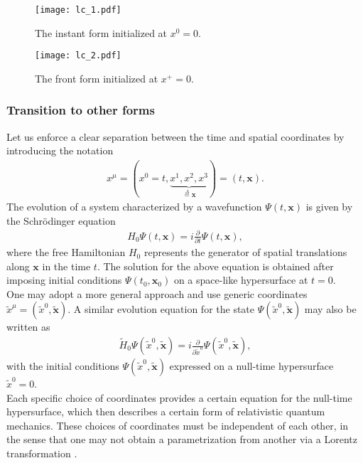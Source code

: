 \begin{figure*}[!h]
\captionsetup[subfigure]{justification=centering}
\begin{subfigure}{.49\textwidth}
  \centering
  \texttt{[image: lc\_1.pdf]}  
  \caption*{\normalsize The instant form initialized at $x^0=0$.}   
\end{subfigure}
\begin{subfigure}{.49\textwidth}
  \centering
  \texttt{[image: lc\_2.pdf]}  
  \caption*{\normalsize The front form initialized at $x^+=0$.}
\end{subfigure}
\end{figure*}

\subsubsection*{\sffamily Transition to other forms}
Let us enforce a clear separation between the time and spatial coordinates by introducing the notation
\begin{align*}
x^\mu=(x^0=t,\underbrace{x^1,x^2,x^3}_{\overset{\Delta}{=}\mathbf{x}})=(t,\mathbf{x}).
\end{align*}
The evolution of a system characterized by a wavefunction $\Psi(t,\mathbf{x})$ is given by the Schr\"{o}dinger equation
\begin{align*}
H_0\Psi(t,\mathbf{x})=i\frac{\partial}{\partial t}\Psi(t,\mathbf{x}),
\end{align*}
where the free Hamiltonian $H_0$ represents the generator of spatial translations along $\mathbf{x}$ in the time $t$. The solution for the above equation is obtained after imposing initial conditions $\Psi(t_0,\mathbf{x}_0)$ on a space-like hypersurface at $t=0$.\\
One may adopt a more general approach and use generic coordinates $\widetilde{x}^\mu=(\widetilde{x}^0,\widetilde{\mathbf{x}})$. A similar evolution equation for the state $\Psi(\widetilde{x}^0,\widetilde{\mathbf{x}})$ may also be written as
\begin{align*}
\widetilde{H}_0\Psi(\widetilde{x}^0,\widetilde{\mathbf{x}})=i\frac{\partial}{\partial \widetilde{x}^0}\Psi(\widetilde{x}^0,\widetilde{\mathbf{x}}),
\end{align*}
with the initial conditions $\Psi(\widetilde{x}^0,\widetilde{\mathbf{x}})$ expressed on a null-time hypersurface $\widetilde{x}^0=0$. \\
Each specific choice of coordinates provides a certain equation for the null-time hypersurface, which then describes a certain form of relativistic quantum mechanics. These choices of coordinates must be independent of each other, in the sense that one may not obtain a parametrization from another via a Lorentz transformation \cite{mantovani}. \\ 
